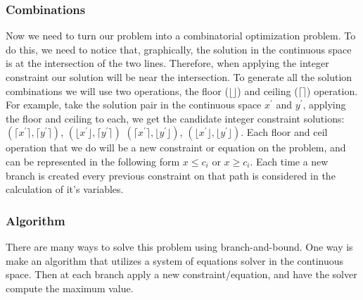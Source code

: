         \subsubsection{Combinations}
        Now we need to turn our problem into a combinatorial optimization problem.
        To do this, we need to notice that, graphically, the solution in the continuous space is at 
        the intersection of the two lines. Therefore, when applying the integer constraint our
        solution will be near the intersection. To generate all the solution combinations we will 
        use two operations, the floor ($\lfloor \rfloor$) and ceiling ($\lceil \rceil$) operation. 
        For example, take the solution pair in the continuous space $x^{'}$ and $y^{'}$,
        applying the floor and ceiling to each, we get the candidate integer constraint solutions:  
        $(\lceil x^{'} \rceil, \lceil y^{'} \rceil)$, $(\lfloor x^{'} \rfloor, \lceil y^{'} \rceil)$
        $(\lceil x^{'} \rceil, \lfloor y^{'} \rfloor)$, $(\lfloor x^{'} \rfloor, \lfloor y^{'} \rfloor)$.
        Each floor and ceil operation that we do will be a new constraint or equation on the problem,
        and can be represented in the following form $x \leq c_i$ or $x \geq c_i$. 
        Each time a new branch is created every previous constraint on that path is 
        considered in the calculation of it's variables.

        \subsubsection{Algorithm}
        There are many ways to solve this problem using branch-and-bound.
        One way is make an algorithm that utilizes a system of equations solver in the continuous space.
        Then at each branch apply a new constraint/equation, and have the solver compute the maximum value.
        